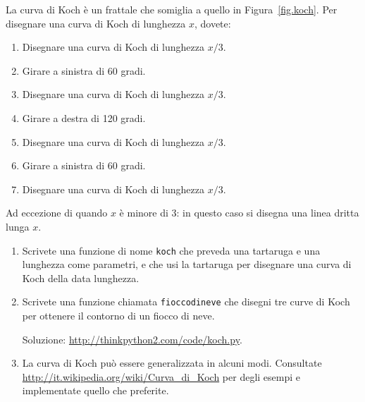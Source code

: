 \documentclass[10pt]{book}
\begin{document}
\vspace{0.2in}
\begin{exercise}

La curva di Koch è un frattale che somiglia a quello in Figura~\ref{fig.koch}.  Per disegnare una curva di Koch di lunghezza $x$, dovete:

\begin{enumerate}

\item Disegnare una curva di Koch di lunghezza $x/3$.

\item Girare a sinistra di 60 gradi.

\item Disegnare una curva di Koch di lunghezza $x/3$.

\item Girare a destra di 120 gradi.

\item Disegnare una curva di Koch di lunghezza $x/3$.

\item Girare a sinistra di 60 gradi.

\item Disegnare una curva di Koch di lunghezza $x/3$.

\end{enumerate}

Ad eccezione di quando $x$ è minore di 3: in questo caso si disegna una linea dritta lunga $x$.

\begin{enumerate}

\item Scrivete una funzione di nome {\tt koch} che preveda una tartaruga e una lunghezza come parametri, e che usi la tartaruga per disegnare una curva di Koch della data lunghezza.

\item Scrivete una funzione chiamata {\tt fioccodineve} che disegni tre curve di Koch per ottenere il contorno di un fiocco di neve.

Soluzione: \url{http://thinkpython2.com/code/koch.py}.

\item La curva di Koch può essere generalizzata in alcuni modi. Consultate 
\url{http://it.wikipedia.org/wiki/Curva_di_Koch} per degli esempi e implementate quello che preferite.

\end{enumerate}
\end{exercise}
\end{document}

